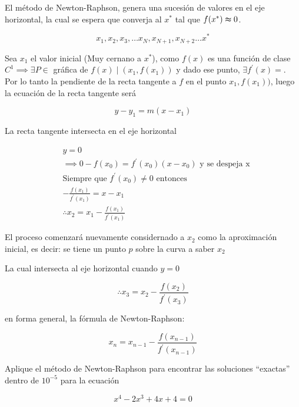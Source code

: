 El método de Newton-Raphson, genera una sucesión de valores en el eje horizontal,
la cual se espera que converja al $x^*$ tal que $f(x^*)\thickapprox 0$.

\begin{equation}
	x_1,x_2,x_3,\dots x_N, x_{N+1},x_{N+2} \dots x^*
\end{equation}

Sea $x_1$ el valor inicial (Muy cernano a $x^*$), como $f(x)$
es una función de clase $C^1\implies \exists P \in $ gráfica de $f(x) \mid (x_1, f(x_1))$
y dado ese punto, $\exists f^{\prime}(x)=$. Por lo tanto la pendiente de la recta tangente
a $f$ en el punto $x_1, f(x_1))$, luego la ecuación de la recta tangente será

\begin{equation}
	y-y_1=m\left(x-x_1\right)
\end{equation}

La recta tangente intersecta en el eje horizontal

\begin{align*}
	 & y=0                                                             \\
	 & \implies 0-f(x_0)=f^{\prime}(x_0)(x-x_0) \text{ y se despeja x} \\
	 & \text{Siempre que } f^{\prime}(x_0)\neq 0 \text{ entonces }     \\
	 & -\frac{f(x_1)}{f^{\prime}(x_1)}=x-x_1                           \\
	 & \therefore x_2=x_1-\frac{f(x_1)}{f^{\prime}(x_1)}
\end{align*}

El proceso comenzará nuevamente considernado a $x_2$ como la aproximación inicial, es decir:
se tiene un punto $p$ sobre la curva a saber $x_2$

La cual intersecta al eje horizontal cuando $y=0$

\begin{equation}
	\therefore x_3=x_2-\frac{f(x_2)}{f^{\prime}(x_3)}
\end{equation}

en forma general, la fórmula de Newton-Raphson:

\begin{equation}
	x_n=x_{n-1}-\frac{f(x_{n-1})}{f^{\prime}(x_{n-1})}
\end{equation}

\begin{example}
	Aplique el método de Newton-Raphson para encontrar las soluciones ``exactas'' dentro de $10^{-5}$ para la ecuación

	\begin{equation*}
		x^4-2x^3+4x+4=0
	\end{equation*}
\end{example}

